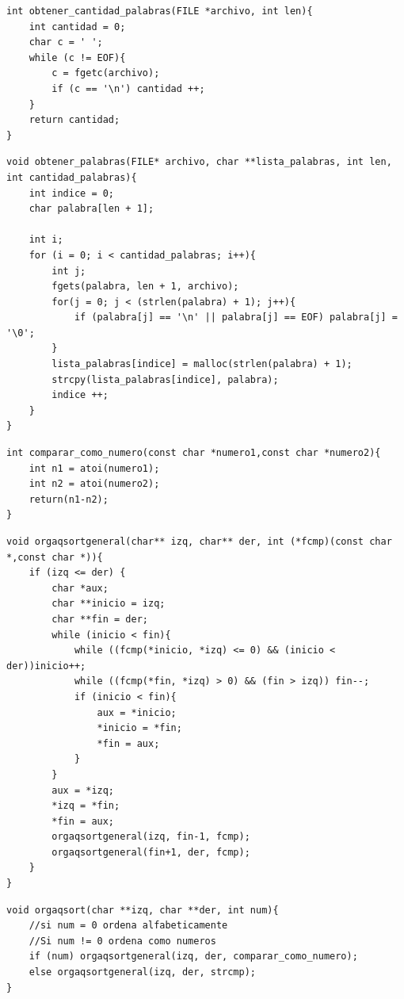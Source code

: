 \documentclass[a4paper, 12pt]{article}
\begin{document}
	\begin{lstlisting}
int obtener_cantidad_palabras(FILE *archivo, int len){
    int cantidad = 0;
    char c = ' ';
    while (c != EOF){
        c = fgetc(archivo);
        if (c == '\n') cantidad ++;
    }
    return cantidad;
}
	\end{lstlisting}
	
	\begin{lstlisting}
void obtener_palabras(FILE* archivo, char **lista_palabras, int len, int cantidad_palabras){
    int indice = 0;
    char palabra[len + 1];

    int i;
    for (i = 0; i < cantidad_palabras; i++){
        int j;
        fgets(palabra, len + 1, archivo);
        for(j = 0; j < (strlen(palabra) + 1); j++){
            if (palabra[j] == '\n' || palabra[j] == EOF) palabra[j] = '\0';
        }
        lista_palabras[indice] = malloc(strlen(palabra) + 1);
        strcpy(lista_palabras[indice], palabra);
        indice ++;
    }
}
	\end{lstlisting}
	
	\begin{lstlisting}
int comparar_como_numero(const char *numero1,const char *numero2){
    int n1 = atoi(numero1);
    int n2 = atoi(numero2);
    return(n1-n2);
}
	\end{lstlisting}
	
	\begin{lstlisting}
void orgaqsortgeneral(char** izq, char** der, int (*fcmp)(const char *,const char *)){
    if (izq <= der) {
        char *aux;
        char **inicio = izq;
        char **fin = der;
        while (inicio < fin){
            while ((fcmp(*inicio, *izq) <= 0) && (inicio < der))inicio++;
            while ((fcmp(*fin, *izq) > 0) && (fin > izq)) fin--;
            if (inicio < fin){
                aux = *inicio;
                *inicio = *fin;
                *fin = aux;
            }
        }
        aux = *izq;
        *izq = *fin;
        *fin = aux;
        orgaqsortgeneral(izq, fin-1, fcmp);
        orgaqsortgeneral(fin+1, der, fcmp);
    }
}
	\end{lstlisting}
	
	\begin{lstlisting}
void orgaqsort(char **izq, char **der, int num){
    //si num = 0 ordena alfabeticamente
    //Si num != 0 ordena como numeros
    if (num) orgaqsortgeneral(izq, der, comparar_como_numero);
    else orgaqsortgeneral(izq, der, strcmp);
}
	\end{lstlisting}
	
\end{document}
